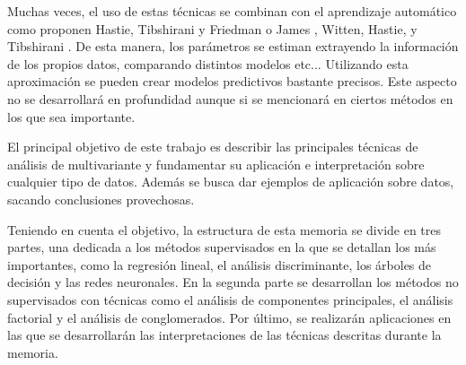 \noindent Muchas veces, el uso de estas técnicas se combinan con el aprendizaje automático como proponen Hastie, Tibshirani y Friedman \cite{Hastie 2001} o  James , Witten, Hastie, y  Tibshirani \cite{James 2013}. De esta manera, los parámetros se estiman extrayendo la información de los propios datos, comparando distintos modelos etc... Utilizando esta aproximación se pueden crear modelos predictivos bastante precisos. Este aspecto no se desarrollará en profundidad aunque si se mencionará en ciertos métodos en los que sea importante. 

\noindent El principal objetivo de este trabajo es describir las principales técnicas de análisis de multivariante y fundamentar su aplicación e interpretación sobre cualquier tipo de datos. Además se busca dar ejemplos de aplicación sobre datos, sacando conclusiones provechosas.

\noindent Teniendo en cuenta el objetivo, la estructura de esta memoria se divide en tres partes, una dedicada a los métodos supervisados en la que se detallan los más importantes, como la regresión lineal, el análisis discriminante, los árboles de decisión  y las redes neuronales. En la segunda parte se desarrollan los métodos no supervisados con técnicas como el análisis de componentes principales, el análisis factorial y el análisis de conglomerados. Por último, se realizarán aplicaciones en las que se desarrollarán las interpretaciones de las técnicas descritas durante la memoria. 





